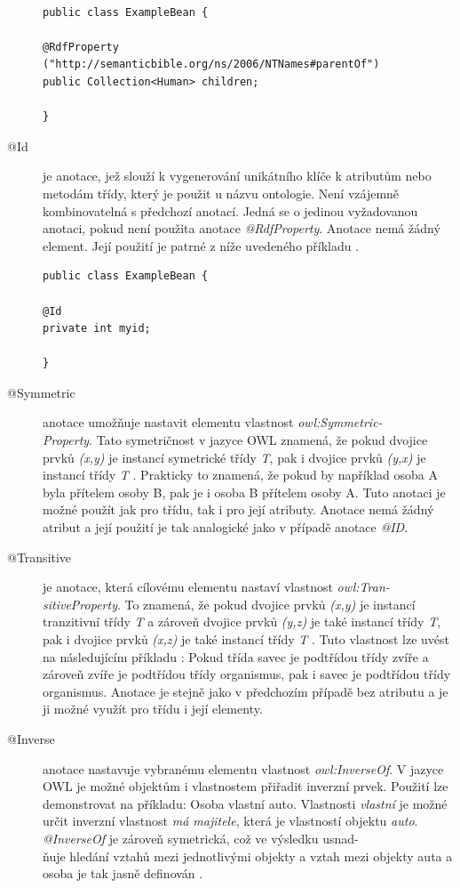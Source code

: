 \documentclass{projekt}
\begin{document}
\begin{description}
\begin{verbatim}

public class ExampleBean {

@RdfProperty
("http://semanticbible.org/ns/2006/NTNames#parentOf")
public Collection<Human> children;

}

\end{verbatim}

\item[@Id] je anotace, jež slouží k vygenerování unikátního klíče k atributům nebo metodám třídy, který je použit u názvu ontologie. Není vzájemně kombinovatelná s předchozí anotací. Jedná se o jedinou vyžadovanou anotaci, pokud není použita anotace {\it @RdfProperty}. Anotace nemá žádný element. Její použití je patrné z níže uvedeného příkladu \cite{deset}.

\begin{verbatim}
public class ExampleBean {
  
@Id
private int myid;

}

\end{verbatim}


\item[@Symmetric] anotace umožňuje nastavit elementu vlastnost {\it owl:Symmetric-\\Property}. Tato symetričnost v jazyce OWL znamená, že pokud dvojice prvků {\it (x,y)} je instancí symetrické třídy {\it T}, pak i dvojice prvků {\it (y,x)} je instancí třídy {\it T} \cite{patnact}. Prakticky to znamená, že pokud by například osoba A byla přítelem osoby B, pak je i osoba B přítelem osoby A.
Tuto anotaci je možné použít jak pro třídu, tak i pro její atributy.
Anotace nemá žádný atribut a její použití je tak analogické jako v případě anotace {\it @ID}.
\\

\item[@Transitive] je anotace, která cílovému elementu nastaví vlastnost {\it owl:Tran-\\sitiveProperty}. To znamená, že pokud dvojice prvků {\it (x,y)} je instancí tranzitivní třídy {\it T} a zároveň dvojice prvků {\it (y,z)} je také instancí třídy {\it T}, pak i dvojice prvků {\it (x,z)} je také instancí třídy {\it T} \cite{patnact}. Tuto vlastnost lze uvést na následujícím příkladu \cite{sestnact}:
Pokud třída savec je podtřídou třídy zvíře a zároveň zvíře je podtřídou třídy organismus, pak i savec je podtřídou třídy organismus.
Anotace je stejně jako v předchozím případě bez atributu a je ji možné využít pro třídu i její elementy.
\\
\item[@Inverse] anotace nastavuje vybranému elementu vlastnost {\it owl:InverseOf}. V jazyce OWL je možné objektům i vlastnostem přiřadit inverzní prvek. Použití lze demonstrovat na příkladu: Osoba vlastní auto. Vlastnosti {\it vlastní} je možné určit inverzní vlastnost {\it má majitele}, která je vlastností objektu {\it auto}. {\it @InverseOf} je zároveň symetrická, což ve výsledku usnad-\\ňuje hledání vztahů mezi jednotlivými objekty a vztah mezi objekty auta a osoba je tak jasně definován \cite{patnact}.


\end{description}
\end{document}
